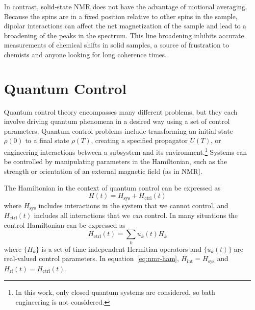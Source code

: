 In contrast, solid-state NMR does not have the advantage of motional averaging. Because the spins are in a fixed position relative to other spins in the sample, dipolar interactions can affect the net magnetization of the sample and lead to a broadening of the peaks in the spectrum. This line broadening inhibits accurate measurements of chemical shifts in solid samples, a source of frustration to chemists and anyone looking for long coherence times.



\section{Quantum Control}

Quantum control theory encompasses many different problems, but they each involve driving quantum phenomena in a desired way using a set of control parameters. Quantum control problems include transforming an initial state $\rho(0)$ to a final state $\rho(T)$, creating a specified propagator $U(T)$, or engineering interactions between a subsystem and its environment.\cite{Dong_2010}\footnote{In this work, only closed quantum systems are considered, so bath engineering is not considered.} Systems can be controlled by manipulating parameters in the Hamiltonian, such as the strength or orientation of an external magnetic field (as in NMR).

The Hamiltonian in the context of quantum control can be expressed as
\begin{equation}
    H(t) = H_{\text{sys}} + H_{\text{ctrl}}(t)
\end{equation}
where $H_{\text{sys}}$ includes interactions in the system that we cannot control, and $H_{\text{ctrl}}(t)$ includes all interactions that we \emph{can} control. In many situations the control Hamiltonian can be expressed as
\[
H_{\text{ctrl}}(t) = \sum_k u_k(t) H_k
\]
where $\{H_k\}$ is a set of time-independent Hermitian operators and $\{u_k(t)\}$ are real-valued control parameters. In equation~\ref{eq:nmr-ham}, $H_{\text{int}} = H_{\text{sys}}$  and $H_{\text{rf}}(t) = H_{\text{ctrl}}(t)$.


